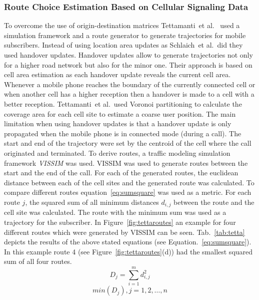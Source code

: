\documentclass[master,english]{hgbthesis}
\begin{document}
\subsubsection{Route Choice Estimation Based on Cellular Signaling Data}
To overcome the use of origin-destination matrices Tettamanti~et al.\ \cite{Tettamanti2012} used a simulation framework and a route generator to generate trajectories for mobile subscribers. Instead of using location area updates as Schlaich~et al.\ did they used handover updates. Handover updates allow to generate trajectories not only for a higher road network but also for the minor one. Their approach is based on cell area estimation as each handover update reveals the current cell area. Whenever a mobile phone reaches the boundary of the currently connected cell or when another cell has a higher reception then a handover is made to a cell with a better reception. Tettamanti~et al.\ used Voronoi partitioning to calculate the coverage area for each cell site to estimate a coarse user position.
The main limitation when using handover updates is that a handover update is only propagated when the mobile phone is in connected mode (during a call).
The start and end of the trajectory were set by the centroid of the cell where the call originated and terminated. To derive routes, a traffic modeling simulation framework \emph{VISSIM} was used. VISSIM was used to generate routes between the start and the end of the call. For each of the generated routes, the euclidean distance between each of the cell sites and the generated route was calculated. To compare different routes equation~\ref{eq:sumsquare} was used  as a metric. For each route $j$, the squared sum of all minimum distances $d_{i,j}$ between the route and the cell site was calculated. The route with the minimum sum was used as a trajectory for the subscriber.
In Figure~\ref{fig:tettaroutes} an example for four different routes which were generated by VISSIM can be seen. Tab.~\ref{tab:tetta} depicts the results of the above stated equations (see Equation.\ \ref{eq:sumsquare}). In this example route 4 (see Figure~\ref{fig:tettaroutes}(d)) had the smallest squared sum of all four routes.
\begin{equation}
\label{eq:sumsquare}
D_j=\sum_{i=1}^{m} d_{i,j}^{2}
\end{equation}
\begin{equation}
\label{eq:minsum}
min(D_j), j = 1,2,\ldots,n
\end{equation}
\end{document}
